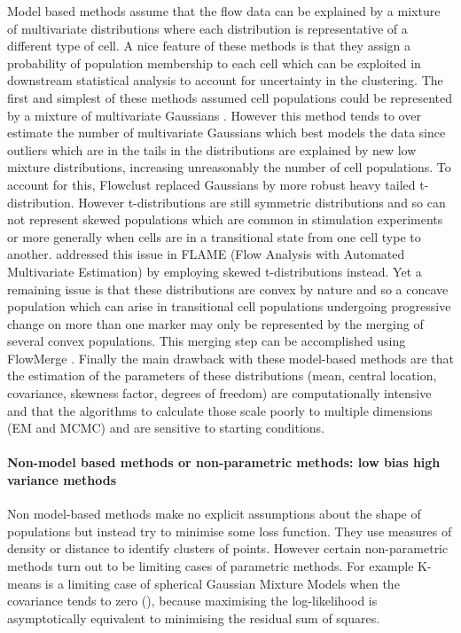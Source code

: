 Model based methods assume that the flow data can be explained by a mixture of multivariate distributions where each distribution is representative of a different type of cell.
A nice feature of these methods is that they assign a probability of population membership to each cell which can be exploited in downstream statistical analysis to account for uncertainty in the clustering.
The first and simplest of these methods assumed cell populations could be represented by a mixture of multivariate Gaussians \citep{Chan:2008gq}.
However this method tends to over estimate the number of multivariate Gaussians which best models the data since outliers which are in the tails in the distributions are explained by new low mixture distributions, increasing unreasonably the number of cell populations.
To account for this, Flowclust \citep{Lo:2008it} replaced Gaussians by more robust heavy tailed t-distribution.
However t-distributions are still symmetric distributions and so can not represent skewed populations which are common in stimulation experiments or more generally when cells are in a transitional state from one cell type to another.
\citet{Pyne:2009hl} addressed this issue in FLAME (Flow Analysis with Automated Multivariate Estimation) by employing skewed t-distributions instead.
Yet a remaining issue is that these distributions are convex by nature and so a concave population which can arise in transitional cell populations undergoing progressive change on more than one marker may only be represented by the merging of several convex populations.
This merging step can be accomplished using FlowMerge \citep{Finak:2009fk}.
Finally the main drawback with these model-based methods are that the estimation of the parameters of these distributions (mean, central location, covariance, skewness factor, degrees of freedom) are computationally intensive and that the algorithms to calculate those scale poorly to multiple dimensions (EM \citep{Dempster:1977ul} and MCMC) and are sensitive to starting conditions.

\paragraph{Non-model based methods or non-parametric methods: low bias high variance methods}

Non model-based methods make no explicit assumptions about the shape of populations but instead try to minimise some loss function.
They use measures of density or distance to identify clusters of points.
However certain non-parametric methods turn out to be limiting cases of parametric methods.
For example K-means is a limiting case of spherical Gaussian Mixture Models when the covariance tends to zero (),
because maximising the log-likelihood is asymptotically equivalent to minimising the residual sum of squares.

